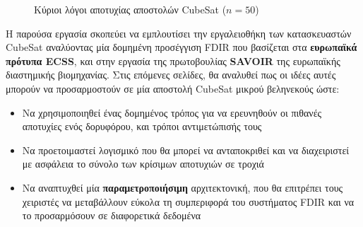 \documentclass[a4paper,nobib]{tufte-book}
\begin{document}
\begin{figure}
	\centering
	\caption[Κύριοι λόγοι αποτυχίας αποστολών CubeSat]{Κύριοι λόγοι αποτυχίας αποστολών CubeSat (\(n=50\)) \autocite{bouwmeester_survey_implementation_2017}}
	\label{fig:whyfail}
\end{figure}


Η παρούσα εργασία σκοπεύει να εμπλουτίσει την εργαλειοθήκη των κατασκευαστών CubeSat αναλύοντας μία δομημένη προσέγγιση \ac{FDIR} που βασίζεται στα \textbf{ευρωπαϊκά πρότυπα \acs{ECSS}}, και στην εργασία της πρωτοβουλίας \textbf{\acs{SAVOIR}} της ευρωπαϊκής διαστημικής βιομηχανίας. Στις επόμενες σελίδες, θα αναλυθεί πως οι ιδέες αυτές μπορούν να προσαρμοστούν σε μία αποστολή CubeSat μικρού βεληνεκούς ώστε:
\begin{itemize}
	\item Να χρησιμοποιηθεί ένας δομημένος τρόπος για να ερευνηθούν οι πιθανές αποτυχίες ενός δορυφόρου, και τρόποι αντιμετώπισής τους
	\item Να προετοιμαστεί λογισμικό που θα μπορεί να ανταποκριθεί και να διαχειριστεί με ασφάλεια το σύνολο των κρίσιμων αποτυχιών σε τροχιά
	\item Να αναπτυχθεί μία \textbf{παραμετροποιήσιμη} αρχιτεκτονική, που θα επιτρέπει τους χειριστές να μεταβάλλουν εύκολα τη συμπεριφορά του συστήματος \acs{FDIR} και να το προσαρμόσουν σε διαφορετικά δεδομένα
\end{itemize}
\end{document}
